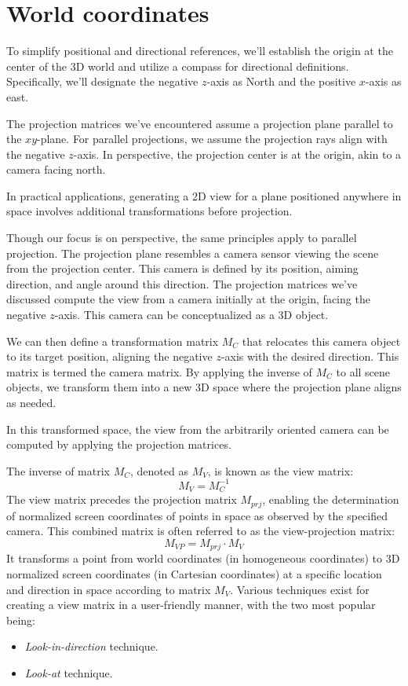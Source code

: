 \section{World coordinates}

To simplify positional and directional references, we'll establish the origin at the center of the 3D world and utilize a compass for directional definitions. 
Specifically, we'll designate the negative $z$-axis as North and the positive $x$-axis as east.

The projection matrices we've encountered assume a projection plane parallel to the $xy$-plane. 
For parallel projections, we assume the projection rays align with the negative $z$-axis. 
In perspective, the projection center is at the origin, akin to a camera facing north.

In practical applications, generating a 2D view for a plane positioned anywhere in space involves additional transformations before projection.

Though our focus is on perspective, the same principles apply to parallel projection. 
The projection plane resembles a camera sensor viewing the scene from the projection center. 
This camera is defined by its position, aiming direction, and angle around this direction. 
The projection matrices we've discussed compute the view from a camera initially at the origin, facing the negative $z$-axis. 
This camera can be conceptualized as a 3D object.

We can then define a transformation matrix $M_C$ that relocates this camera object to its target position, aligning the negative $z$-axis with the desired direction. 
This matrix is termed the camera matrix. 
By applying the inverse of $M_C$ to all scene objects, we transform them into a new 3D space where the projection plane aligns as needed.

In this transformed space, the view from the arbitrarily oriented camera can be computed by applying the projection matrices.

The inverse of matrix $M_C$, denoted as $M_V$, is known as the view matrix:
\[M_V=M_C^{-1}\]
The view matrix precedes the projection matrix $M_{prj}$, enabling the determination of normalized screen coordinates of points in space as observed by the specified camera. 
This combined matrix is often referred to as the view-projection matrix:
\[M_{VP}=M_{prj} \cdot M_V\]
It transforms a point from world coordinates (in homogeneous coordinates) to 3D normalized screen coordinates (in Cartesian coordinates) at a specific location and direction in space according to matrix $M_V$.
Various techniques exist for creating a view matrix in a user-friendly manner, with the two most popular being:
\begin{itemize}
    \item \textit{Look-in-direction} technique.
    \item \textit{Look-at} technique.
\end{itemize}

